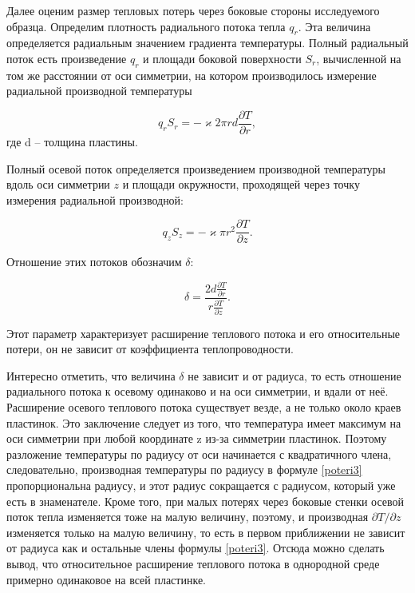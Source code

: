\documentclass[a4paper,12pt]{article} %
\begin{document}
Далее оценим размер тепловых потерь через боковые стороны исследуемого образца. Определим плотность радиального потока тепла $ q_r $. Эта величина определяется радиальным значением градиента температуры. Полный радиальный поток есть произведение $ q_r $ и площади боковой поверхности $ S_r $, вычисленной на том же расстоянии от оси симметрии, на котором производилось измерение радиальной производной температуры

\begin{equation}\label{poteri1}
q_r S_r = - \varkappa 2 \pi rd \frac{\partial T}{\partial r},
\end{equation}
где d -- толщина пластины.

Полный осевой поток определяется произведением производной температуры вдоль оси симметрии $ z $ и площади окружности, проходящей через точку измерения радиальной производной:

\begin{equation}\label{poteri2}
q_z S_z = - \varkappa \pi r^2 \frac{\partial T}{\partial z}.
\end{equation}

Отношение этих потоков обозначим $ \delta $:

\begin{equation}\label{poteri3}
\delta = \frac{2d \frac{\partial T}{\partial r}}{r \frac{\partial T}{\partial z}}.
\end{equation}

Этот параметр характеризует расширение теплового потока и его относительные потери, он не зависит от коэффициента теплопроводности.

Интересно отметить, что величина $ \delta $ не зависит и от радиуса, то есть отношение радиального потока к осевому одинаково и на оси симметрии, и вдали от неё. Расширение осевого теплового потока существует везде, а не только около краев пластинок. Это заключение следует из того, что температура имеет максимум на оси симметрии при любой координате z из-за симметрии пластинок. Поэтому разложение температуры по радиусу от оси начинается с квадратичного члена, следовательно, производная температуры по радиусу в формуле \eqref{poteri3} пропорциональна радиусу, и этот радиус сокращается с радиусом, который уже есть в знаменателе. Кроме того, при малых потерях через боковые стенки осевой поток тепла изменяется тоже на малую величину, поэтому, и производная $ \partial T/\partial z $ изменяется только на малую величину, то есть в первом приближении не зависит от радиуса как и остальные члены формулы \eqref{poteri3}. Отсюда можно сделать вывод, что относительное расширение теплового потока в однородной среде примерно одинаковое на всей пластинке.
\end{document}
